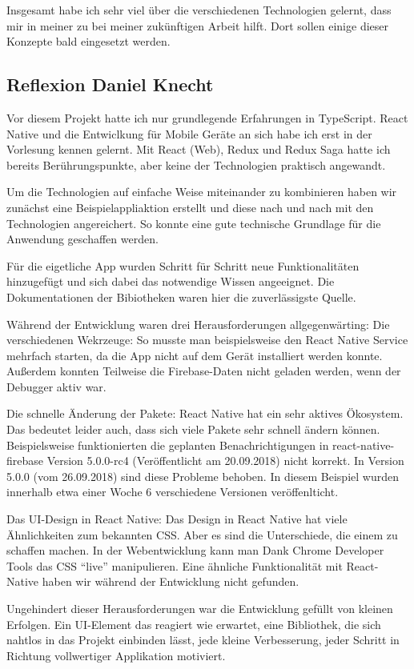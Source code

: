 Insgesamt habe ich sehr viel über die verschiedenen Technologien gelernt, dass mir in meiner zu bei meiner zukünftigen Arbeit hilft.
Dort sollen einige dieser Konzepte bald eingesetzt werden. 

\subsection{Reflexion Daniel Knecht}
Vor diesem Projekt hatte ich nur grundlegende Erfahrungen in TypeScript.
React Native und die Entwiclkung für Mobile Geräte an sich habe ich erst in der Vorlesung kennen gelernt.
Mit React (Web), Redux und Redux Saga hatte ich bereits Berührungspunkte,
aber keine der Technologien praktisch angewandt.

Um die Technologien auf einfache Weise miteinander zu kombinieren haben wir zunächst eine
Beispielappliaktion erstellt und diese nach und nach mit den Technologien angereichert.
So konnte eine gute technische Grundlage für die Anwendung geschaffen werden.

Für die eigetliche App wurden Schritt für Schritt neue Funktionalitäten hinzugefügt
und sich dabei das notwendige Wissen angeeignet.
Die Dokumentationen der Bibiotheken waren hier die zuverlässigste Quelle.

Während der Entwicklung waren drei Herausforderungen allgegenwärting:
Die verschiedenen Wekrzeuge: So musste man beispielsweise den React Native Service mehrfach starten,
da die App nicht auf dem Gerät installiert werden konnte.
Außerdem konnten Teilweise die Firebase-Daten nicht geladen werden,
wenn der Debugger aktiv war.

Die schnelle Änderung der Pakete:
React Native hat ein sehr aktives Ökosystem.
Das bedeutet leider auch,
dass sich viele Pakete sehr schnell ändern können.
Beispielsweise funktionierten die geplanten Benachrichtigungen in react-native-firebase Version 5.0.0-rc4 (Veröffentlicht am 20.09.2018) nicht korrekt.
In Version 5.0.0 (vom 26.09.2018) sind diese Probleme behoben. In diesem Beispiel wurden innerhalb etwa einer Woche 6 verschiedene Versionen veröffenlticht.

Das UI-Design in React Native:
Das Design in React Native hat viele Ähnlichkeiten zum bekannten CSS.
Aber es sind die Unterschiede, die einem zu schaffen machen.
In der Webentwicklung kann man Dank Chrome Developer Tools das CSS \enquote{live} manipulieren.
Eine ähnliche Funktionalität mit React-Native haben wir während der Entwicklung nicht gefunden.

Ungehindert dieser Herausforderungen war die Entwicklung gefüllt von kleinen Erfolgen.
Ein UI-Element das reagiert wie erwartet,
eine Bibliothek, die sich nahtlos in das Projekt einbinden lässt,
jede kleine Verbesserung, jeder Schritt in Richtung vollwertiger Applikation motiviert.

